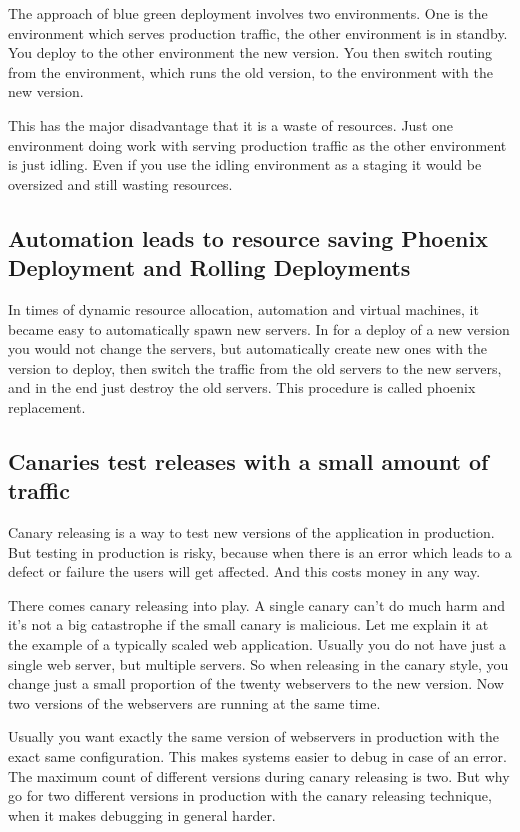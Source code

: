 The approach of blue green deployment involves two environments. One is the environment
which serves production traffic, the other environment is in standby. You deploy to the
other environment the new version. You then switch routing from the environment, which
runs the old version, to the environment with the new version.

This has the major disadvantage that it is a waste of resources. Just one environment
doing work with serving production traffic as the other environment is just idling. Even
if you use the idling environment as a staging it would be oversized and still wasting
resources.

\subsection{Automation leads to resource saving Phoenix Deployment and Rolling
Deployments}

In times of dynamic resource allocation, automation and virtual machines, it became easy
to automatically spawn new servers. In for a deploy of a new version you would not
change the servers, but automatically create new ones with the version to deploy, then
switch the traffic from the old servers to the new servers, and in the end just destroy
the old servers. This procedure is called phoenix replacement.

\subsection{Canaries test releases with a small amount of traffic}


Canary releasing is a way to test new versions of the application in production. But
testing in production is risky, because when there is an error which leads to a defect
or failure the users will get affected. And this costs money in any way.

There comes canary releasing into play. A single canary can't do much harm and it's not
a big catastrophe if the small canary is malicious. Let me explain it at the example of
a typically scaled web application. Usually you do not have just a single web server,
but multiple servers. So when releasing in the canary style, you change just a small
proportion of the twenty webservers to the new version. Now two versions of the
webservers are running at the same time.

Usually you want exactly the same version of webservers in production with the exact
same configuration. This makes systems easier to debug in case of an error. The maximum
count of different versions during canary releasing is two. But why go for two different
versions in production with the canary releasing technique, when it makes debugging in
general harder.

